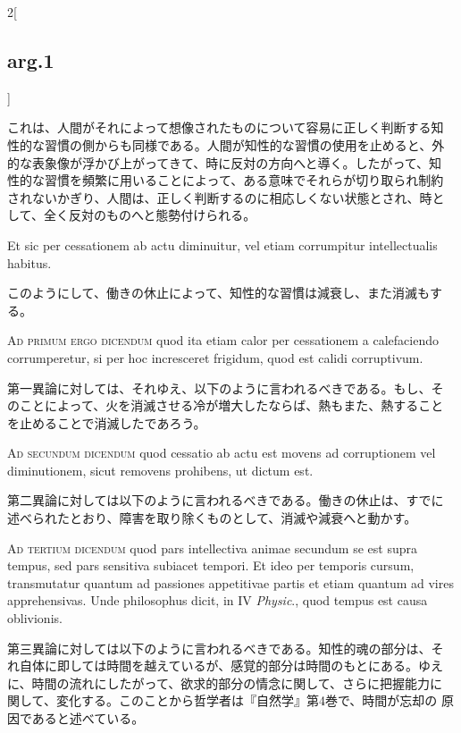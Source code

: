 \documentclass[paper=a4paper,fontsize=10pt,jafontsize=9pt,titlepage]{jlreq}
\begin{document}
\begin{paracol}{2}[\subsection{arg.1}]
\switchcolumn

これは、人間がそれによって想像されたものについて容易に正しく判断する知
性的な習慣の側からも同様である。人間が知性的な習慣の使用を止めると、外
的な表象像が浮かび上がってきて、時に反対の方向へと導く。したがって、知
性的な習慣を頻繁に用いることによって、ある意味でそれらが切り取られ制約
されないかぎり、人間は、正しく判断するのに相応しくない状態とされ、時と
して、全く反対のものへと態勢付けられる。

\switchcolumn*

Et sic per cessationem ab actu diminuitur, vel etiam corrumpitur
intellectualis habitus.

\switchcolumn

このようにして、働きの休止によって、知性的な習慣は減衰し、また消滅もす
る。

\switchcolumn*[\subsection{ad.1}]

{\scshape Ad primum ergo dicendum} quod ita etiam calor per
cessationem a calefaciendo corrumperetur, si per hoc incresceret
frigidum, quod est calidi corruptivum.

\switchcolumn

第一異論に対しては、それゆえ、以下のように言われるべきである。もし、そ
のことによって、火を消滅させる冷が増大したならば、熱もまた、熱すること
を止めることで消滅したであろう。

\switchcolumn*[\subsection{ad.2}]

{\scshape Ad secundum dicendum} quod cessatio ab actu est movens ad
corruptionem vel diminutionem, sicut removens prohibens, ut dictum
est.

\switchcolumn

第二異論に対しては以下のように言われるべきである。働きの休止は、すでに
述べられたとおり、障害を取り除くものとして、消滅や減衰へと動かす。

\switchcolumn*[\subsection{ad.3}]

{\scshape Ad tertium dicendum} quod pars intellectiva animae secundum
se est supra tempus, sed pars sensitiva subiacet tempori. Et ideo per
temporis cursum, transmutatur quantum ad passiones appetitivae partis
et etiam quantum ad vires apprehensivas. Unde philosophus dicit, in IV
{\itshape Physic}., quod tempus est causa oblivionis.

\switchcolumn

第三異論に対しては以下のように言われるべきである。知性的魂の部分は、そ
れ自体に即しては時間を越えているが、感覚的部分は時間のもとにある。ゆえ
に、時間の流れにしたがって、欲求的部分の情念に関して、さらに把握能力に
関して、変化する。このことから哲学者は『自然学』第4巻で、時間が忘却の
原因であると述べている。

\end{paracol}
\end{document}
